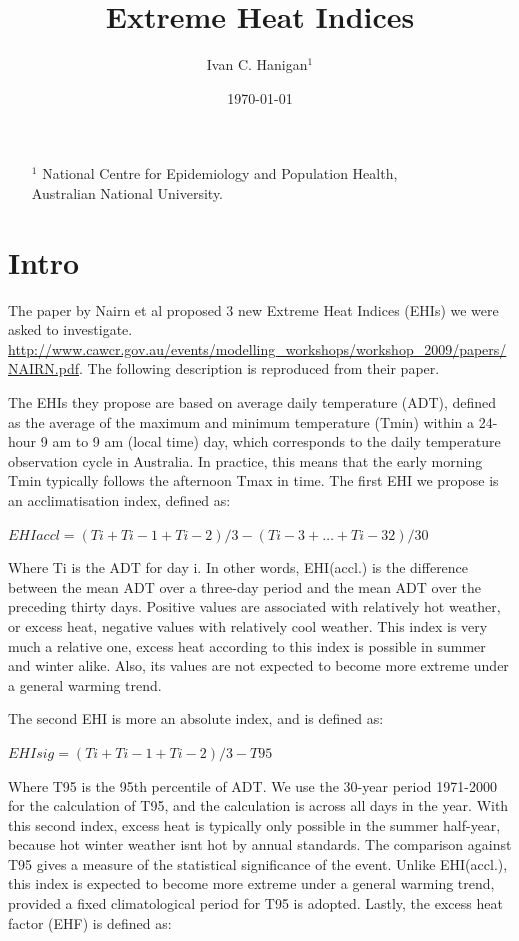 \documentclass[a4paper]{article}
\begin{document}

\title{Extreme Heat Indices} 
\author{Ivan C. Hanigan$^{1}$}
\date{\today}                 
\maketitle
\begin{itemize}
\item [$^1$] National Centre for Epidemiology and Population Health, \\Australian National University.
\end{itemize}

\setcounter{page}{1}
\tableofcontents 
{}
\setcounter{page}{1}

\section{Intro}
The paper by Nairn et al proposed 3 new Extreme Heat Indices (EHIs) we were asked to investigate.  \url{http://www.cawcr.gov.au/events/modelling_workshops/workshop_2009/papers/NAIRN.pdf}.  The following description is reproduced from their paper.

 The EHIs they propose are based on average daily temperature (ADT), defined as the average of the
 maximum and minimum temperature (Tmin) within a 24-hour 9 am to 9 am (local time) day, which
 corresponds to the daily temperature observation cycle in Australia. In practice, this means that the early
 morning Tmin typically follows the afternoon Tmax in time.
 The first EHI we propose is an acclimatisation index, defined as: 
 
 $EHI{accl} = (Ti + T{i}-1 + T{i}-2)/3 - (T{i}-3 + \ldots + T{i}-32)/30$
 
 Where Ti is the ADT for day i. In other words, EHI(accl.) is the difference between the mean ADT over a three-day period and the mean ADT over the preceding thirty days. Positive values are associated with relatively hot weather, or excess heat, negative values with relatively cool weather. This index is very much a relative one, excess heat according to this index is possible in summer and winter
 alike. Also, its values are not expected to become more extreme under a general warming trend.
 
 The second EHI is more an absolute index, and is defined as:

 $EHI{sig} = (Ti + T{i}-1 + T{i}-2)/3 - T{95}$
 
 Where T95 is the 95th percentile of ADT. We use the 30-year period 1971-2000 for the calculation of T95, and the
 calculation is across all days in the year. With this second index, excess heat is typically only possible in the summer half-year, because hot winter weather isnt hot by annual standards. The comparison against T95
 gives a measure of the statistical significance of the event. Unlike EHI(accl.), this index is expected to
 become more extreme under a general warming trend, provided a fixed climatological period for T95 is
 adopted. Lastly, the excess heat factor (EHF) is defined as:
 
\end{document}
